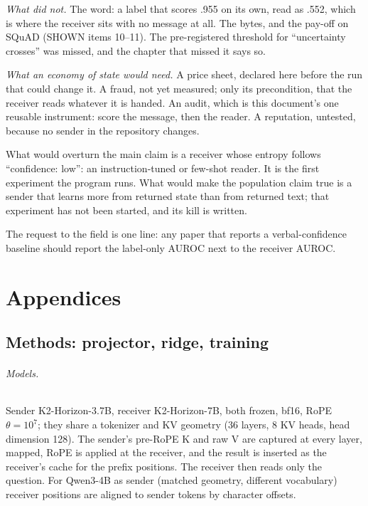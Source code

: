 \documentclass[11pt,a4paper]{report}
\begin{document}
\emph{What did not.} The word: a label that scores .955 on its own, read as .552, which is where the receiver sits with no message at all. The bytes, and the pay-off on SQuAD (SHOWN items 10--11). The pre-registered threshold for ``uncertainty crosses'' was missed, and the chapter that missed it says so.

\emph{What an economy of state would need.} A price sheet, declared here before the run that could change it. A fraud, not yet measured; only its precondition, that the receiver reads whatever it is handed. An audit, which is this document's one reusable instrument: score the message, then the reader. A reputation, untested, because no sender in the repository changes.

What would overturn the main claim is a receiver whose entropy follows ``confidence: low'': an instruction-tuned or few-shot reader. It is the first experiment the program runs. What would make the population claim true is a sender that learns more from returned state than from returned text; that experiment has not been started, and its kill is written.

The request to the field is one line: any paper that reports a verbal-confidence baseline should report the label-only AUROC next to the receiver AUROC.

\appendix
\part*{Appendices}

\chapter{Methods: projector, ridge, training}
\label{app:methods}

\paragraph{Models.} Sender K2-Horizon-3.7B, receiver K2-Horizon-7B, both frozen, bf16, RoPE $\theta = 10^{7}$; they share a tokenizer and KV geometry (36 layers, 8 KV heads, head dimension 128). The sender's pre-RoPE K and raw V are captured at every layer, mapped, RoPE is applied at the receiver, and the result is inserted as the receiver's cache for the prefix positions. The receiver then reads only the question. For Qwen3-4B as sender (matched geometry, different vocabulary) receiver positions are aligned to sender tokens by character offsets.
\end{document}
